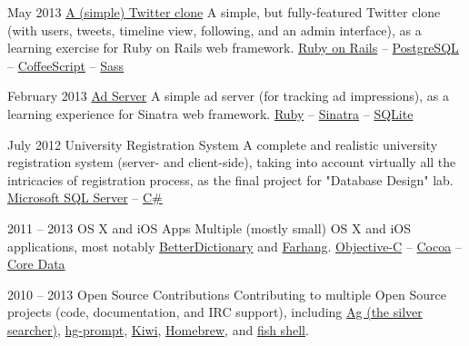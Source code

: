 \documentclass{tccv}
\begin{document}
{{\begin{project_list}
\item{May 2013}
	 {}
	 {\href{https://github.com/pooriaazimi/twitter}{A (simple) Twitter clone}}
	 {A simple, but fully-featured Twitter clone (with users, tweets, timeline view, following, and an admin interface), as a learning exercise for Ruby on Rails web framework.}
	 {
		 \href{http://rubyonrails.org}{Ruby on Rails} -- 
		 \href{http://www.postgresql.org}{PostgreSQL} -- 
		 \href{http://coffeescript.org}{CoffeeScript} -- 
		 \href{http://sass-lang.com}{Sass}
	 }



\item{February 2013}
	 {}
	 {\href{https://github.com/pooriaazimi/adserver}{Ad Server}}
	 {A simple ad server (for tracking ad impressions), as a learning experience for Sinatra web framework.}
	 {
	 	\href{https://www.ruby-lang.org/en/}{Ruby} -- 
		\href{http://www.sinatrarb.com}{Sinatra} -- 
		\href{http://www.sqlite.org}{SQLite}
	 }



\item{July 2012}
	 {}
	 {University Registration System}
	 {A complete and realistic university registration system (server- and client-side), taking into account virtually all the intricacies of registration process, as the final project for "Database Design" lab.}
	 {
	 	\href{http://www.microsoft.com/en-us/sqlserver/default.aspx}{Microsoft SQL Server} -- 
		\href{https://en.wikipedia.org/wiki/C_Sharp_(programming_language)}{C\#}
	 }
	 
	 
	 
\item{2011 -- 2013}
	 {}
	 {OS X and iOS Apps}
	 {Multiple (mostly small) OS X and iOS applications, most notably \href{http://pooriaazimi.github.io/BetterDictionary/}{BetterDictionary} and \href{http://www.turnedondigital.com/?portfolio=farhang-iphone-app}{Farhang}.}
	 {
	 	\href{https://en.wikipedia.org/wiki/Objective-C}{Objective-C} -- 
		\href{https://en.wikipedia.org/wiki/Cocoa_(API)}{Cocoa} -- 
		\href{https://en.wikipedia.org/wiki/Core_Data}{Core Data}
	 }
	 


\item{2010 -- 2013}
	 {}
	 {Open Source Contributions}
	 {Contributing to multiple Open Source projects (code, documentation, and IRC support), including 
	 \href{https://github.com/ggreer/the_silver_searcher}{Ag (the silver searcher)}, 
	 \href{http://bitbucket.org/sjl/hg-prompt/}{hg-prompt}, \href{https://github.com/allending/Kiwi}{Kiwi}, 
	 \href{https://github.com/mxcl/homebrew}{Homebrew}, and 
	 \href{http://fishshell.com}{fish shell}.}
	 {}



\end{project_list}}}
\end{document}

